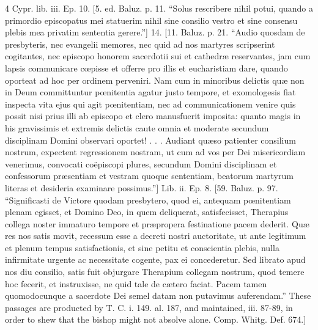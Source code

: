 4
Cypr. lib. iii. Ep. 10. [5. ed. Baluz. p. 11. “Solus rescribere nihil potui, quando a primordio episcopatus mei statuerim nihil sine consilio vestro et sine consensu plebis mea privatim sententia gerere.”] 14. [11. Baluz. p. 21. “Audio quosdam de presbyteris, nec evangelii memores, nec quid ad nos martyres scripserint cogitantes, nec episcopo honorem sacerdotii sui et cathedræ reservantes, jam cum lapsis communicare cœpisse et offerre pro illis et eucharistiam dare, quando oporteat ad hoc per ordinem perveniri. Nam cum in minoribus delictis quæ non in Deum committuntur pœnitentia agatur justo tempore, et exomologesis fiat inspecta vita ejus qui agit pœnitentiam, nec ad communicationem venire quis possit nisi prius illi ab episcopo et clero manusfuerit imposita: quanto magis in his gravissimis et extremis delictis caute omnia et moderate secundum disciplinam Domini observari oportet! . . . Audiant quæso patienter consilium nostrum, expectent regressionem nostram, ut cum ad vos per Dei misericordiam venerimus, convocati coëpiscopi plures, secundum Domini disciplinam et confessorum præsentiam et vestram quoque sententiam, beatorum martyrum literas et desideria examinare possimus.”] Lib. ii. Ep. 8. [59. Baluz. p. 97. “Significasti de Victore quodam presbytero, quod ei, antequam pœnitentiam plenam egisset, et Domino Deo, in quem deliquerat, satisfecisset, Therapius collega noster immaturo tempore et præpropera festinatione pacem dederit. Quæ res nos satis movit, recessum esse a decreti nostri auctoritate, ut ante legitimum et plenum tempus satisfactionis, et sine petitu et conscientia plebis, nulla infirmitate urgente ac necessitate cogente, pax ei concederetur. Sed librato apud nos diu consilio, satis fuit objurgare Therapium collegam nostrum, quod temere hoc fecerit, et instruxisse, ne quid tale de cætero faciat. Pacem tamen quomodocunque a sacerdote Dei semel datam non putavimus auferendam.” These passages are producted by T. C. i. 149. al. 187, and maintained, iii. 87-89, in order to shew that the bishop might not absolve alone. Comp. Whitg. Def. 674.]

